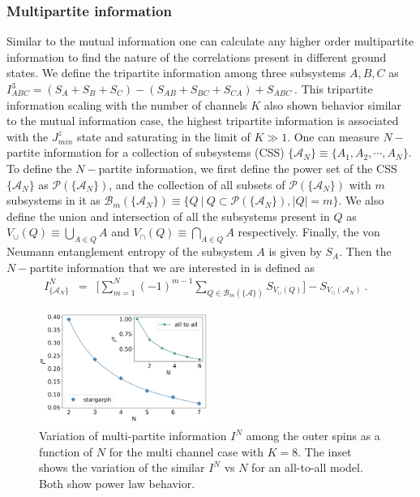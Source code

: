 \documentclass[reprint,prb,superscriptaddress]{revtex4-1}
\begin{document}
\subsubsection{Multipartite information}
\noindent Similar to the mutual information one can calculate any higher order multipartite information to find the nature of the correlations present in different ground states. We define the tripartite information among three subsystems $A,B,C$ as $I^3_{ABC} = (S_A+S_B+S_C)-(S_{AB}+S_{BC}+S_{CA})+S_{ABC}~$. This tripartite information scaling with the number of channels $K$ also shown behavior similar to the mutual information case, the highest tripartite information is associated with the $J^z_{min}$ state and saturating in the limit of $K\gg 1$. One can measure $N-$partite information for a collection of subsystems (CSS) $\{\mathcal{A}_N\}\equiv\{A_1,A_2,\cdots,A_N\}$. To define the $N-$partite information, we first define the power set of the CSS $\{\mathcal{A}_N\}$ as $\mathcal{P}(\{\mathcal{A}_{N}\})$, and the collection of all subsets of $\mathcal{P}(\{\mathcal{A}_{N}\})$ with $m$ subsystems in it as $\mathcal{B}_m(\{\mathcal{A}_N\})\equiv \{ Q~| ~Q\subset \mathcal{P}(\{\mathcal{A}_{N}\}), |Q|=m \}$. We also define the union and intersection of all the subsystems present in $Q$ as ${V}_{\cup}({Q})\equiv \bigcup_{A\in Q} A$ and ${V}_{\cap}({Q})\equiv \bigcap_{A\in Q} A$ respectively. Finally, the von Neumann entanglement entropy of the subsystem $A$ is given by $S_{A} $. Then the $N-$partite information that we are interested in is defined as
\begin{eqnarray}
I^{N}_{\{\mathcal{A}_N\}} &=& \bigg[\displaystyle\sum_{m=1}^{N} (-1)^{m-1} \displaystyle\sum_{Q \in \mathcal{B}_m(\{\mathcal{A}\})} S_{V_{\cup}({Q})} \bigg]- S_{V_{\cap}(\mathcal{A}_N)}~.~~~~
\label{eq:I_N_definition}
\end{eqnarray}
\begin{figure}
\includegraphics[width=0.49\textwidth]{plt/2022_IN_vs_N_K8.png}
\caption{Variation of multi-partite information $I^N$ among the outer spins as a function of $N$ for the multi channel case with $K=8$. The inset shows the variation of the similar $I^N$ vs $N$ for an all-to-all model. Both show power law behavior.}
\label{fig:Im_vs_m}
\end{figure}
\end{document}
